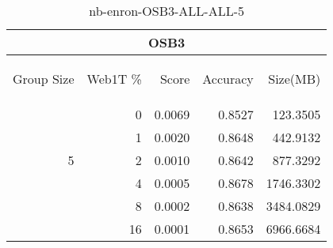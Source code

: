 \begin{center}
\begin{table}[htbp] 
 \begin{center}
\begin{tabular}{ | r | r | r | r | r |}
\hline
\multicolumn{5}{|c|}{OSB3}\\
\hline
\begin{sideways}Group Size\end{sideways} & \begin{sideways}Web1T \%\end{sideways} & \begin{sideways}Score\end{sideways} & \begin{sideways}Accuracy\end{sideways} & \begin{sideways}Size(MB)\end{sideways}\\
\hline
\multirow{5}{*}{5}
 & 0 & 0.0069 & 0.8527 & 123.3505\\ \cline{2-5}
 & 1 & 0.0020 & 0.8648 & 442.9132\\ \cline{2-5}
 & 2 & 0.0010 & 0.8642 & 877.3292\\ \cline{2-5}
 & 4 & 0.0005 & 0.8678 & 1746.3302\\ \cline{2-5}
 & 8 & 0.0002 & 0.8638 & 3484.0829\\ \cline{2-5}
 & 16 & 0.0001 & 0.8653 & 6966.6684\\ \cline{2-5}
\hline
\end{tabular}
\caption{nb-enron-OSB3-ALL-ALL-5}
\label{table:nb-enron-OSB3-ALL-ALL-5}
\end{center}
 \end{table}
\end{center}


